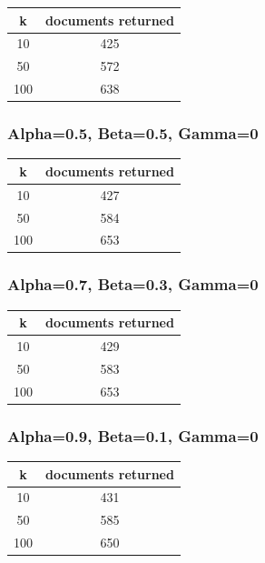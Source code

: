 \documentclass{article}
\begin{document}
\begin{center}
\begin{tabular}{|c|c|} \hline
\textbf{k} & \textbf{documents returned} \\ \hline
10 & 425\\
50 & 572\\
100 & 638\\ \hline
\end{tabular}
\end{center}

\subsubsection{Alpha=0.5, Beta=0.5, Gamma=0}

\begin{center}
\begin{tabular}{|c|c|} \hline
\textbf{k} & \textbf{documents returned} \\ \hline
10 & 427 \\
50 & 584\\
100 & 653\\ \hline
\end{tabular}
\end{center}

\subsubsection{Alpha=0.7, Beta=0.3, Gamma=0}

\begin{center}
\begin{tabular}{|c|c|} \hline
\textbf{k} & \textbf{documents returned} \\ \hline
10 & 429\\
50 & 583\\
100 & 653\\ \hline
\end{tabular}
\end{center}

\subsubsection{Alpha=0.9, Beta=0.1, Gamma=0}

\begin{center}
\begin{tabular}{|c|c|} \hline
\textbf{k} & \textbf{documents returned} \\ \hline
10 & 431\\
50 & 585\\
100 & 650\\ \hline
\end{tabular}
\end{center}
\end{document}
